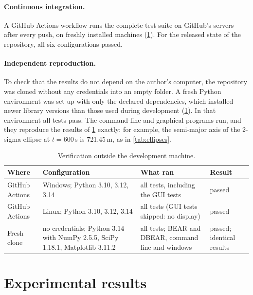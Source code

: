 \documentclass[11pt,a4paper]{article}
\theoremstyle{plain}
\theoremstyle{remark}
\begin{document}
\paragraph{Continuous integration.} A GitHub Actions workflow runs the
complete test suite on GitHub's servers after every push, on freshly
installed machines (\cref{tab:ci}). For the released state of the
repository, all six configurations passed.

\paragraph{Independent reproduction.} To check that the results do not
depend on the author's computer, the repository was cloned without any
credentials into an empty folder. A fresh Python environment was set up with
only the declared dependencies, which installed newer library versions than
those used during development (\cref{tab:ci}). In that environment all
\testsTotal{} tests pass. The command-line and graphical programs run, and
they reproduce the results of \cref{sec:experiments} exactly: for example,
the semi-major axis of the 2-sigma ellipse at $t=600$\,s is 721.45\,m, as
in \cref{tab:ellipses}.

\begin{table}[htbp]
\centering\small
\caption{Verification outside the development machine.}
\label{tab:ci}
\begin{tabularx}{\linewidth}{@{}lXXl@{}}
\toprule
Where & Configuration & What ran & Result\\
\midrule
GitHub Actions & Windows; Python 3.10, 3.12, 3.14 & all \testsTotal{} tests, including the GUI tests & passed\\
GitHub Actions & Linux; Python 3.10, 3.12, 3.14 & all tests (GUI tests skipped: no display) & passed\\
Fresh clone & no credentials; Python 3.14 with NumPy 2.5.5, SciPy 1.18.1, Matplotlib 3.11.2
            & all tests; BEAR and DBEAR, command line and windows & passed; identical results\\
\bottomrule
\end{tabularx}
\end{table}

\section{Experimental results}
\label{sec:experiments}
\end{document}
